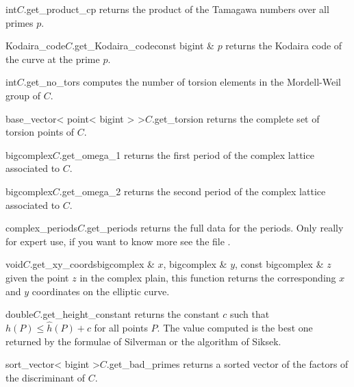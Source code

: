 \begin{cfcode}{int}{$C$.get_product_cp}{}
  returns the product of the Tamagawa numbers over all primes $p$.
\end{cfcode}

\begin{cfcode}{Kodaira_code}{$C$.get_Kodaira_code}{const bigint & $p$}
  returns the Kodaira code of the curve at the prime $p$.
\end{cfcode}

\begin{fcode}{int}{$C$.get_no_tors}{}
  computes the number of torsion elements in the Mordell-Weil group of $C$.
\end{fcode}

\begin{fcode}{base_vector< point< bigint > >}{$C$.get_torsion}{}
  returns the complete set of torsion points of $C$.
\end{fcode}

\begin{fcode}{bigcomplex}{$C$.get_omega_1}{}
  returns the first period of the complex lattice associated to $C$.
\end{fcode}

\begin{fcode}{bigcomplex}{$C$.get_omega_2}{}
  returns the second period of the complex lattice associated to $C$.
\end{fcode}

\begin{fcode}{complex_periods}{$C$.get_periods}{}
  returns the full data for the periods.  Only really for expert use, if you want to know more
  see the file .
\end{fcode}

\begin{fcode}{void}{$C$.get_xy_coords}{bigcomplex & $x$, bigcomplex & $y$, const bigcomplex & $z$}
  given the point $z$ in the complex plain, this function returns the corresponding $x$ and $y$
  coordinates on the elliptic curve.
\end{fcode}

\begin{fcode}{double}{$C$.get_height_constant}{}
  returns the constant $c$ such that $h(P) \leq \hat{h}(P) + c$ for all points $P$.  The value
  computed is the best one returned by the formulae of Silverman or the algorithm of Siksek.
\end{fcode}

\begin{cfcode}{sort_vector< bigint >}{$C$.get_bad_primes}{}
  returns a sorted vector of the factors of the discriminant of $C$.
\end{cfcode}

